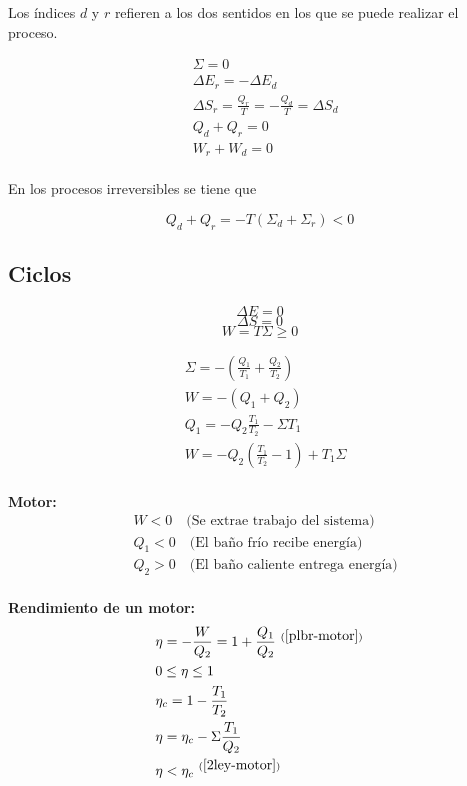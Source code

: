 Los índices $d$ y $r$ refieren a los dos sentidos en los que se puede realizar el proceso.

\begin{equation}
\begin{split}
    &\Sigma = 0\\
    &\Delta E_r = -\Delta E_d\\
    &\Delta S_r = \frac{Q_r}{T}=-\frac{Q_d}{T}=\Delta S_d\\
    &Q_d+Q_r=0\\
    &W_r+W_d=0\\
\end{split}
\nonumber
\end{equation}

En los procesos irreversibles se tiene que

\[Q_d+Q_r=-T\left(\Sigma_d+\Sigma_r\right)<0\]

\subsection{Ciclos}

\[\Delta E = 0\]
\[\Delta S = 0\]
\bigbreak
{}
\[W=T\Sigma\geq 0\]
\bigbreak

\begin{equation}
\begin{split}
    &\Sigma = -\left(\frac{Q_1}{T_1}+\frac{Q_2}{T_2}\right)\\
    &W=-(Q_1+Q_2)\\
    &Q_1 = -Q_2\frac{T_1}{T_2}-\Sigma T_1\\
    &W = -Q_2\left(\frac{T_1}{T_2}-1\right)+T_1\Sigma\\
\end{split}
\nonumber
\end{equation}
\bigbreak

\textbf{Motor:}
\begin{equation}
\begin{split}
    &W<0 \quad \text{(Se extrae trabajo del sistema)}\\
    &Q_1 <0 \quad \text{(El baño frío recibe energía)}\\
    &Q_2>0 \quad \text{(El baño caliente entrega energía)}\\
\end{split}
\nonumber
\end{equation}
\bigbreak

\textbf{Rendimiento de un motor:}
\begin{equation}
\begin{split}
    &\eta = -\frac{W}{Q_2}= 1+\frac{Q_1}{Q_2}  \text{ }^{(\ref{plbr-motor})}\\
    &0\leq\eta\leq 1\\
    &\eta_c=1-\frac{T_1}{T_2}\\
    &\eta=\eta_c-\Sigma\frac{T_1}{Q_2}\\
    &\eta < \eta_c \text{ }^{(\ref{2ley-motor})}\\%
\end{split}
\nonumber
\end{equation}
\bigbreak


